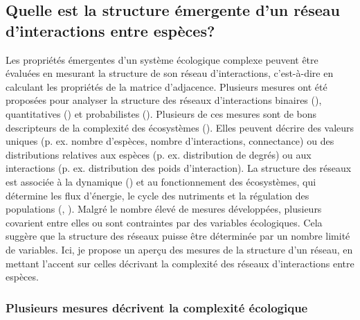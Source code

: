 \subsection{Quelle est la structure émergente d'un réseau d'interactions entre espèces?} 

Les propriétés émergentes d'un système écologique complexe peuvent être évaluées
en mesurant la structure de son réseau d'interactions, c'est-à-dire en calculant
les propriétés de la matrice d'adjacence. Plusieurs mesures ont été proposées
pour analyser la structure des réseaux d'interactions binaires
(\cite{Delmas2019Analysing}), quantitatives (\cite{Bersier2002Quantitative}) et
probabilistes (\cite{Poisot2016Structure}). Plusieurs de ces mesures sont de
bons descripteurs de la complexité des écosystèmes (\cite{Landi2018Complexity}).
Elles peuvent décrire des valeurs uniques (p. ex. nombre d'espèces, nombre
d'interactions, connectance) ou des distributions relatives aux espèces (p. ex.
distribution de degrés) ou aux interactions (p. ex. distribution des poids
d'interaction). La structure des réseaux est associée à la dynamique
(\cite{Pascual2006Ecological}) et au fonctionnement des écosystèmes, qui
détermine les flux d'énergie, le cycle des nutriments et la régulation des
populations (\cite{McCann2011Food}, \cite{Thompson2012Food}). Malgré le nombre
élevé de mesures développées, plusieurs covarient entre elles ou sont
contraintes par des variables écologiques. Cela suggère que la structure des
réseaux puisse être déterminée par un nombre limité de variables. Ici, je
propose un aperçu des mesures de la structure d'un réseau, en mettant l'accent
sur celles décrivant la complexité des réseaux d'interactions entre espèces. 

\subsubsection{Plusieurs mesures décrivent la complexité écologique} 

